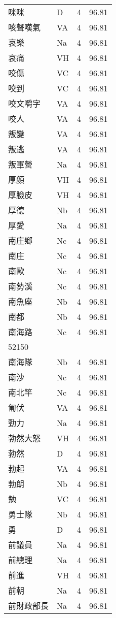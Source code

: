 \documentclass[twocolumn]{book}
\begin{document}
\begin{supertabular}{llrr}
咪咪 & D & 4 &  96.81\\
咳聲嘆氣 & VA & 4 &  96.81\\
哀樂 & Na & 4 &  96.81\\
哀痛 & VH & 4 &  96.81\\
咬傷 & VC & 4 &  96.81\\
咬到 & VC & 4 &  96.81\\
咬文嚼字 & VA & 4 &  96.81\\
咬人 & VA & 4 &  96.81\\
叛變 & VA & 4 &  96.81\\
叛逃 & VA & 4 &  96.81\\
叛軍營 & Na & 4 &  96.81\\
厚顏 & VH & 4 &  96.81\\
厚臉皮 & VH & 4 &  96.81\\
厚德 & Nb & 4 &  96.81\\
厚愛 & Na & 4 &  96.81\\
南庄鄉 & Nc & 4 &  96.81\\
南庄 & Nc & 4 &  96.81\\
南歐 & Nc & 4 &  96.81\\
南勢溪 & Nc & 4 &  96.81\\
南魚座 & Nb & 4 &  96.81\\
南都 & Nb & 4 &  96.81\\
南海路 & Nc & 4 &  96.81\\
52150\\
南海隊 & Nb & 4 &  96.81\\
南沙 & Nc & 4 &  96.81\\
南北竿 & Nc & 4 &  96.81\\
匍伏 & VA & 4 &  96.81\\
勁力 & Na & 4 &  96.81\\
勃然大怒 & VH & 4 &  96.81\\
勃然 & D & 4 &  96.81\\
勃起 & VA & 4 &  96.81\\
勃朗 & Nb & 4 &  96.81\\
勉 & VC & 4 &  96.81\\
勇士隊 & Nb & 4 &  96.81\\
勇 & D & 4 &  96.81\\
前議員 & Na & 4 &  96.81\\
前總理 & Na & 4 &  96.81\\
前進 & VH & 4 &  96.81\\
前朝 & Na & 4 &  96.81\\
前財政部長 & Na & 4 &  96.81\\

\end{supertabular}
\end{document}
